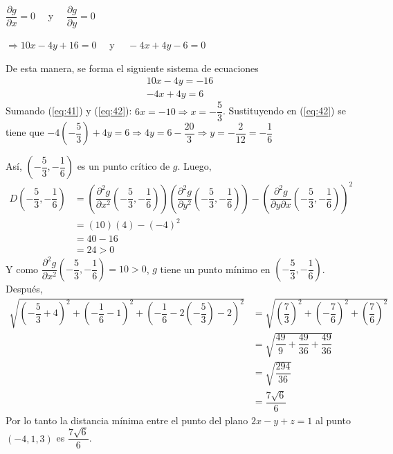 \documentclass[fleqn, 12pt]{article}
\newcommand{\derivadaparcial}[2]{\dfrac{\partial {#1}}{\partial {#2}}}
\newcommand{\derivadaparcialn}[3]{\dfrac{\partial^{#3} {#1}}{\partial {#2}^{#3}}}
\newcommand{\derivadaparcialnd}[3]{\dfrac{\partial^{2} {#1}}{\partial {#3} \partial {#2}}}
\begin{document}
\begin{enumerate}
        $ \derivadaparcial{g}{x} = 0 \quad $ y $ \quad \derivadaparcial{g}{y} = 0 $

        $ \Longrightarrow 10x - 4y + 16 = 0 \quad $ y $ \quad -4x + 4y - 6 = 0 $

        De esta manera, se forma el siguiente sistema de ecuaciones
        \begin{align}
            10x - 4y = -16 \label{eq:41} \\
            -4x + 4y = 6 \label{eq:42}
        \end{align}
        Sumando (\ref{eq:41}) y (\ref{eq:42}): $ 6x = -10 \Longrightarrow x = -\dfrac{5}{3} $. Sustituyendo en (\ref{eq:42}) se tiene que $ -4 \left( -\dfrac{5}{3} \right) + 4y = 6 \Longrightarrow 4y = 6 - \dfrac{20}{3} \Longrightarrow y = -\dfrac{2}{12} = -\dfrac{1}{6} $

        Así, $ \left( -\dfrac{5}{3}, -\dfrac{1}{6} \right) $ es un punto crítico de $ g $. Luego,
        \begin{align*}
            D \left( -\dfrac{5}{3}, -\dfrac{1}{6} \right) &= \left( \derivadaparcialn{g}{x}{2} \left( -\dfrac{5}{3}, -\dfrac{1}{6} \right) \right) \left( \derivadaparcialn{g}{y}{2} \left( -\dfrac{5}{3}, -\dfrac{1}{6} \right) \right) - \left( \derivadaparcialnd{g}{x}{y} \left( -\dfrac{5}{3}, -\dfrac{1}{6} \right) \right)^2 \\
            &= (10)(4) - (-4)^2 \\
            &= 40 - 16 \\
            &= 24 > 0
        \end{align*}
        Y como $ \derivadaparcialn{g}{x}{2} \left( -\dfrac{5}{3}, -\dfrac{1}{6} \right) = 10 > 0 $, $ g $ tiene un punto mínimo en $ \left( -\dfrac{5}{3}, -\dfrac{1}{6} \right) $. Después,
        \begin{align*}
            \sqrt{\left( -\dfrac{5}{3} + 4 \right)^2 + \left( -\dfrac{1}{6} - 1 \right)^2 + \left( -\dfrac{1}{6} - 2 \left( -\dfrac{5}{3} \right) - 2 \right)^2} &= \sqrt{\left( \dfrac{7}{3} \right)^2 + \left( -\dfrac{7}{6} \right)^2 + \left( \dfrac{7}{6} \right)^2} \\
            &= \sqrt{\dfrac{49}{9} + \dfrac{49}{36} + \dfrac{49}{36}} \\
            &= \sqrt{\dfrac{294}{36}} \\
            &= \dfrac{7 \sqrt{6}}{6}
        \end{align*}
        Por lo tanto la distancia mínima entre el punto del plano $ 2x - y + z = 1 $ al punto $ (-4,1,3) $ es $ \dfrac{7 \sqrt{6}}{6} $.


\end{enumerate}
\end{document}
